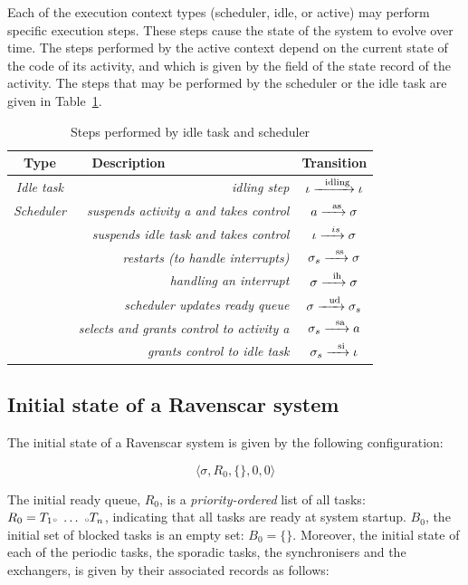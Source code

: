 Each of the execution context types (scheduler, idle, or active) may
perform specific execution steps. These steps cause the state of the
system to evolve over time. The steps performed by the active context
depend on the current state of the code of its activity, and which is
given by the  field of the state record of the activity. The
steps that may be performed by the scheduler or the idle task are
given in Table~\ref{legal_idle_sched}.

\begin{table}
\caption{Steps performed by idle task and scheduler}
\label{legal_idle_sched}
\centering
\begin{tabular}{|c|r|c|}
\hline
\textbf{Type} & \textbf{Description\ \ \ \ \ \ \ \ \ \ \ \ \ \ \ \ \ } & \textbf{Transition}\\
\hline
\emph{Idle task} & \emph{idling step} & $\iota \xrightarrow{\ \ \text{idling}}
\iota$\\
\hline
\emph{Scheduler} & \emph{suspends activity a and takes control} & $a
\xrightarrow{\ \ \text{as}} \sigma$\\
 & \emph{suspends idle task and takes control} &
$\iota\xrightarrow{\ \ is}\sigma$\\ 
 & \emph{restarts (to handle
  interrupts)} & $\sigma_s\xrightarrow{\ \ \text{ss}}\sigma$\\ 
 & \emph{handling an interrupt} & $\sigma\xrightarrow{\ \ \text{ih}}\sigma$\\
 & \emph{scheduler updates ready queue} &
$\sigma\xrightarrow{\ \ \text{ud}}\sigma_s$\\ 
 & \emph{selects and grants control to activity a} &
$\sigma_s\xrightarrow{\ \ \text{sa}}a$\\ 
 & \emph{grants control to idle task} &
$\sigma_s\xrightarrow{\ \ \text{si}}\iota$\\
\hline
\end{tabular}
\end{table}

\subsection{Initial state of a Ravenscar system}

The initial state of a Ravenscar system is given by the following configuration:

\begin{equation}
  \big\langle \sigma, R_0, \{\}, 0, 0 \big\rangle
\end{equation}

The initial ready queue, $R_0$, is a \emph{priority-ordered} list of
all tasks: $ R_0 = T_1 {\scriptscriptstyle \circ} \ \ldots \ {\scriptscriptstyle \circ} T_n$, indicating
that all tasks are ready at system startup. $B_0$, the initial set of
blocked tasks is an empty set: $B_0=\{\}$. Moreover, the initial state
of each of the periodic tasks, the sporadic tasks, the synchronisers
and the exchangers, is given by their associated records as follows:\\

